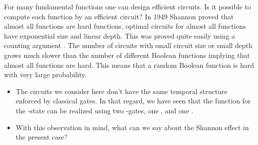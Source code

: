 \begin{myexercise}
For many fundamental functions one can design efficient circuits.
Is it possible to compute each function by an efficient circuit? In 
1949 Shannon proved that almost all functions are hard functions, optimal
circuits for almost all functions have exponential size and linear depth.
This was proved quite easily using a counting argument \cite{Weg87}. The number of circuits with small circuit size or
small depth grows much slower than the number of different Boolean
functions implying that almost all functions are hard. This means that
a random Boolean function is hard with very large probability.  
\begin{itemize}
 \item[(i)] The circuits we consider here don't have the same temporal structure enforced by classical gates.  In that regard, we have seen that the function for the \W-state can be realized using two \COPY-gates, one \AND, and one \OR.  
 \item[(ii)] With this observation in mind, what can we say about the Shannon effect in the present case?  
\end{itemize}
\end{myexercise}
